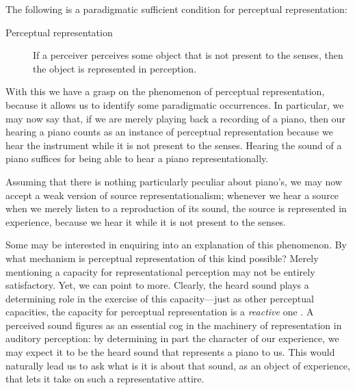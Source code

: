 \documentclass[sloppy, journal, git, bytitle, dodraft]{humapap}
\begin{document}
\sect The following is a paradigmatic sufficient condition for perceptual representation:
\begin{description}
	\item[Perceptual representation] If a perceiver perceives some object that is not present to the senses, then the object is represented in perception.
\end{description}
With this we have a grasp on the phenomenon of perceptual representation, because it allows us to identify some paradigmatic occurrences. In particular, we may now say that, if we are merely playing back a recording of a piano, then our hearing a piano counts as an instance of perceptual representation because we hear the instrument while it is not present to the senses. Hearing the sound of a piano suffices for being able to hear a piano representationally.


Assuming that there is nothing particularly peculiar about piano's, we may now accept a weak version of source representationalism; whenever we hear a source when we merely listen to a reproduction of its sound, the source is  represented in experience, because we hear it while it is not present to the senses.

Some may be interested in enquiring into an explanation of this phenomenon. By what mechanism is perceptual representation of this kind possible? Merely mentioning a capacity for representational perception may not be entirely satisfactory. Yet, we can point to more. Clearly, the heard sound plays a determining role in the exercise of this capacity---just as other perceptual capacities, the capacity for perceptual representation is a \emph{reactive} one \autocites[][]{nietzsche1887aa}[see][p. 4]{kalderon2012ab}. A perceived sound figures as an essential cog in the machinery of representation in auditory perception: by determining in part the character of our experience, we may expect it to be the heard sound that represents a piano to us. This would naturally lead us to ask what is it is about that sound, as an object of experience, that lets it take on such a representative attire.
\end{document}
